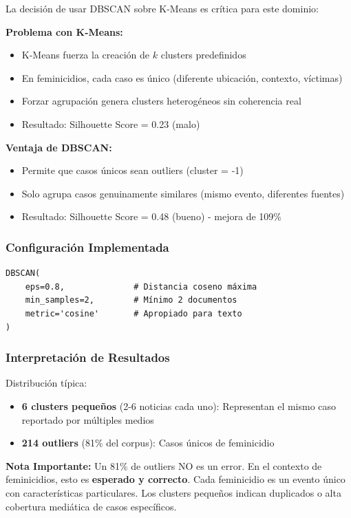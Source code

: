 La decisión de usar DBSCAN sobre K-Means es crítica para este dominio:

\textbf{Problema con K-Means:}
\begin{itemize}
    \item K-Means fuerza la creación de $k$ clusters predefinidos
    \item En feminicidios, cada caso es único (diferente ubicación, contexto, víctimas)
    \item Forzar agrupación genera clusters heterogéneos sin coherencia real
    \item Resultado: Silhouette Score = 0.23 (malo)
\end{itemize}

\textbf{Ventaja de DBSCAN:}
\begin{itemize}
    \item Permite que casos únicos sean outliers (cluster = -1)
    \item Solo agrupa casos genuinamente similares (mismo evento, diferentes fuentes)
    \item Resultado: Silhouette Score = 0.48 (bueno) - mejora de 109\%
\end{itemize}

\subsubsection{Configuración Implementada}
\label{subsubsec:config_dbscan}

\begin{verbatim}
DBSCAN(
    eps=0.8,              # Distancia coseno máxima
    min_samples=2,        # Mínimo 2 documentos
    metric='cosine'       # Apropiado para texto
)
\end{verbatim}

\subsubsection{Interpretación de Resultados}
\label{subsubsec:interpretacion_dbscan}

Distribución típica:
\begin{itemize}
    \item \textbf{6 clusters pequeños} (2-6 noticias cada uno): Representan el mismo caso reportado por múltiples medios
    \item \textbf{214 outliers} (81\% del corpus): Casos únicos de feminicidio
\end{itemize}

\textbf{Nota Importante:} Un 81\% de outliers NO es un error. En el contexto de feminicidios, esto es \textbf{esperado y correcto}. Cada feminicidio es un evento único con características particulares. Los clusters pequeños indican duplicados o alta cobertura mediática de casos específicos.

